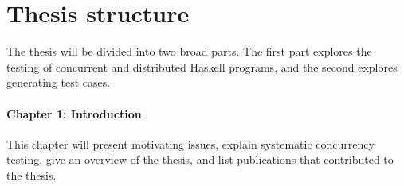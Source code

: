 \documentclass{article}
\begin{document}
\section{Thesis structure}
\label{sec:outline}

The thesis will be divided into two broad parts. The first part
explores the testing of concurrent and distributed Haskell programs,
and the second explores generating test cases.

\paragraph{Chapter 1: Introduction} This chapter will present
motivating issues, explain systematic concurrency testing, give an
overview of the thesis, and list publications that contributed to the
thesis.
\end{document}
